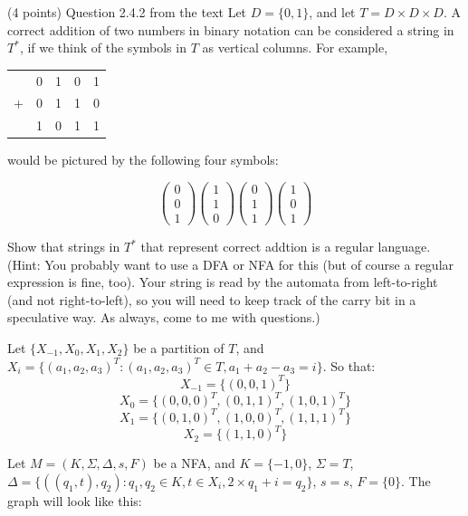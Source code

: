 \documentclass[paper=a4, fontsize=11pt]{scrartcl} %
\begin{document}
\begin{fancyquotes}
  (4 points) Question 2.4.2 from the text Let $D = \{0,1\}$, and let
  $T = D\times D\times D$. A correct addition of two numbers in binary
  notation can be considered a string in $T^*$, if we think of the
  symbols in $T$ as vertical columns. For example,

  \begin{center}
    \begin{tabular}[hp]{rrrrr}
      &0 &1 &0 &1\\
      + &0 &1 &1 &0\\
      \hline
      &1 &0 &1 &1\\
    \end{tabular}
  \end{center}

  would be pictured by the following four symbols:

  \[
  \begin{pmatrix}0\\0\\1\end{pmatrix}
  \begin{pmatrix}1\\1\\0\end{pmatrix}
  \begin{pmatrix}0\\1\\1\end{pmatrix}
  \begin{pmatrix}1\\0\\1\end{pmatrix}
  \]

  Show that strings in $T^*$ that represent correct addtion is a
  regular language. (Hint: You probably want to use a DFA or NFA for
  this (but of course a regular expression is fine, too). Your string
  is read by the automata from left-to-right (and not right-to-left),
  so you will need to keep track of the carry bit in a speculative
  way. As always, come to me with questions.)
\end{fancyquotes}

Let $\{X_{-1},X_0,X_1,X_2\}$ be a partition of $T$, and
$X_i = \{(a_1,a_2,a_3)^T: (a_1,a_2,a_3)^T\in T, a_1+a_2-a_3=i\}$.
So that:
\[X_{-1} = \{(0,0,1)^T\}\]
\[X_0 = \{(0,0,0)^T, (0,1,1)^T, (1,0,1)^T\}\]
\[X_1 = \{(0,1,0)^T, (1,0,0)^T, (1,1,1)^T\}\]
\[X_2 = \{(1,1,0)^T\}\]

Let $M = (K,\Sigma,\Delta,s,F)$ be a NFA, and $K = \{-1,0\}$, $\Sigma
= T $, $\Delta = \{((q_1,t),q_2): q_1,q_2\in K, t\in X_i, 2\times
q_1+i=q_2 \} $, $s = s$, $F = \{0\}$.
The graph will look like this:
\end{document}
